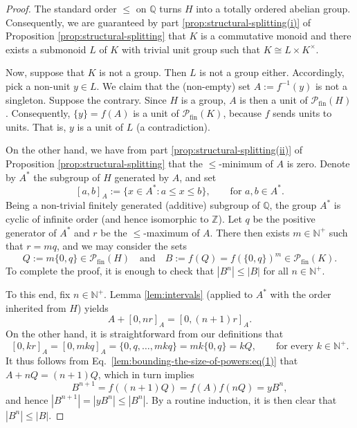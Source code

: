 \documentclass[11pt,reqno]{amsart}
\theoremstyle{definition}
\theoremstyle{remark}
\theoremstyle{theoremdd}
\newcommand{\fin}{\mathrm{fin}}
\renewcommand{\,}{\kern 0.1em}
\begin{document}
\begin{proof}
The standard order $\le$ on $\mathbb Q$ turns $H$ into a totally ordered abelian group. Consequently, we are guaranteed by part \ref{prop:structural-splitting(i)} of Proposition \ref{prop:structural-splitting} that $K$ is a commutative monoid and there exists a submonoid $L$ of $K$ with trivial unit group such that $K \cong L \times K^\times$.

Now, suppose that $K$ is not a group. Then $L$ is not a group either. Accordingly, pick a non-unit $y \in L$. We claim that the (non-empty) set $A := f^{-1}(y)$ is not a singleton. Suppose the contrary. Since $H$ is a group, $A$ is then a unit of $\mathcal P_\fin(H)$. Consequently, $\{y\} = f(A)$ is a unit of $\mathcal P_\fin(K)$, because $f$ sends units to units. That is, $y$ is a unit of $L$ (a contradiction). 

On the other hand, we have from part \ref{prop:structural-splitting(ii)} of Proposition \ref{prop:structural-splitting} that the $\le$-minimum of $A$ is zero. Denote by $A^\ast$ the subgroup of $H$ generated by $A$, and set
\[
[a,b]_A := \{x \in A^\ast: a \le x \le b\},
\qquad\text{for } a, b \in A^\ast.
\]
Being a non-trivial finitely generated (additive) subgroup of $\mathbb Q$, the group $A^\ast$ is cyclic of infinite order (and hence isomorphic to $\mathbb Z$). Let $q$ be the positive generator of $A^\ast$ and $r$ be the $\le$-maximum of $A$. There then exists $m \in \mathbb N^+$ such that  $r = mq$, and we may consider the sets
\[
Q := m\{0, q\} \in \mathcal P_\fin(H)
\quad\text{and}\quad
B := f(Q) = f(\{0, q\})^m \in \mathcal P_\fin(K).
\]
To complete the proof, it is enough to check that $|B^n| \le |B|$ for all $n \in \mathbb N^+$.

To this end, fix $n \in \mathbb N^+$. Lemma \ref{lem:intervals} (applied to $A^\ast$ with the order inherited from $H$) yields
\begin{equation}
\label{lem:bounding-the-size-of-powers:eq(1)}
A + [0, nr]_A = [0, (n+1)r]_A.
\end{equation}
On the other hand, it is straightforward from our definitions that 
\[
[0, kr]_A = [0, mkq]_A = \{0, q, \ldots, mkq\} = mk \{0, q\} = kQ,
\qquad\text{for every }
k \in \mathbb N^+. 
\]
It thus follows from Eq.~\eqref{lem:bounding-the-size-of-powers:eq(1)} that $
A + nQ = (n+1) Q$, which in turn implies
\[
B^{n+1} = f( (n+1) Q) = f(A) f(nQ) = yB^n,
\]
and hence $|B^{n+1}| = |yB^n| \le |B^n|$. 
By a routine induction, it is then clear that $|B^n| \le |B|$.
\end{proof}
\end{document}
